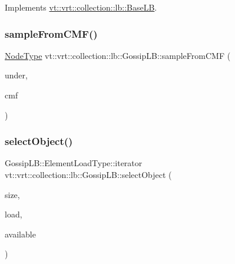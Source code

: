 Implements \hyperlink{structvt_1_1vrt_1_1collection_1_1lb_1_1_base_l_b_a69a398c54f8129f365171a1189ffcd84}{vt\+::vrt\+::collection\+::lb\+::\+Base\+LB}.

\mbox{\label{structvt_1_1vrt_1_1collection_1_1lb_1_1_gossip_l_b_a1a9e88510b1b61a181c9b4dcb3a8c153}} 
\subsubsection{\texorpdfstring{sample\+From\+C\+M\+F()}{sampleFromCMF()}}
{\footnotesize\ttfamily \hyperlink{namespacevt_a866da9d0efc19c0a1ce79e9e492f47e2}{Node\+Type} vt\+::vrt\+::collection\+::lb\+::\+Gossip\+L\+B\+::sample\+From\+C\+MF (\begin{DoxyParamCaption}\item[{\hyperlink{structvt_1_1vrt_1_1collection_1_1lb_1_1_gossip_l_b_abb53f1d4bd3c37f3e68c3b5b0e1f1c86}{Node\+Set\+Type} const \&}]{under,  }\item[{std\+::vector$<$ double $>$ const \&}]{cmf }\end{DoxyParamCaption})\hspace{0.3cm}{\ttfamily [protected]}}

\mbox{\label{structvt_1_1vrt_1_1collection_1_1lb_1_1_gossip_l_b_adafa0d7c3295e095149f48c3027b3173}} 
\subsubsection{\texorpdfstring{select\+Object()}{selectObject()}}
{\footnotesize\ttfamily Gossip\+L\+B\+::\+Element\+Load\+Type\+::iterator vt\+::vrt\+::collection\+::lb\+::\+Gossip\+L\+B\+::select\+Object (\begin{DoxyParamCaption}\item[{\hyperlink{structvt_1_1vrt_1_1collection_1_1lb_1_1_base_l_b_a215e22b9f12678303f49615ae3be05cc}{Load\+Type}}]{size,  }\item[{\hyperlink{structvt_1_1vrt_1_1collection_1_1lb_1_1_base_l_b_aa286d31a0820a8fc9218ccb858368fca}{Element\+Load\+Type} \&}]{load,  }\item[{std\+::set$<$ \hyperlink{structvt_1_1vrt_1_1collection_1_1lb_1_1_base_l_b_a15a2f756b59c8c2437985206b32aa403}{Obj\+I\+D\+Type} $>$ const \&}]{available }\end{DoxyParamCaption})\hspace{0.3cm}{\ttfamily [protected]}}

